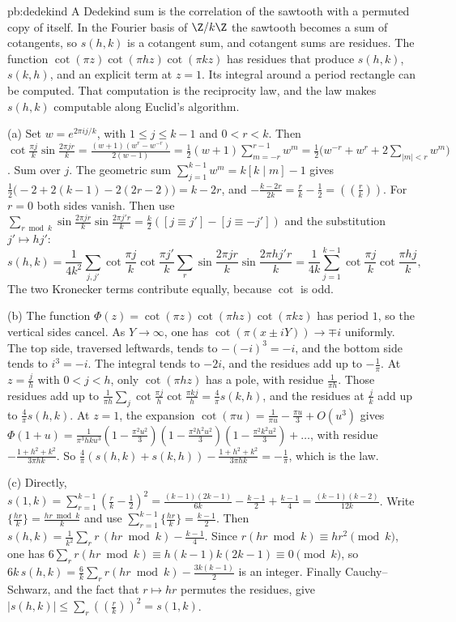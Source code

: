 \begin{solution}{pb:dedekind}
\idea A Dedekind sum is the correlation of the sawtooth with a permuted copy of itself. In the Fourier basis of $\Z/k\Z$ the sawtooth becomes a sum of cotangents, so $s(h,k)$ is a cotangent sum, and cotangent sums are residues. The function $\cot(\pi z)\cot(\pi hz)\cot(\pi kz)$ has residues that produce $s(h,k)$, $s(k,h)$, and an explicit term at $z=1$. Its integral around a period rectangle can be computed. That computation is the reciprocity law, and the law makes $s(h,k)$ computable along Euclid's algorithm.

\writeup (a) Set $w=e^{2\pi ij/k}$, with $1\le j\le k-1$ and $0<r<k$. Then $\cot\frac{\pi j}k\sin\frac{2\pi jr}k=\frac{(w+1)(w^r-w^{-r})}{2(w-1)}=\frac12(w+1)\sum_{m=-r}^{r-1}w^m=\frac12\bigl(w^{-r}+w^r+2\sum_{|m|<r}w^m\bigr)$. Sum over $j$. The geometric sum $\sum_{j=1}^{k-1}w^m=k[k\mid m]-1$ gives $\frac12\bigl(-2+2(k-1)-2(2r-2)\bigr)=k-2r$, and $-\frac{k-2r}{2k}=\frac rk-\frac12=((\frac rk))$. For $r=0$ both sides vanish. Then use $\sum_{r\bmod k}\sin\frac{2\pi jr}k\sin\frac{2\pi j'r}k=\frac k2([j\equiv j']-[j\equiv-j'])$ and the substitution $j'\mapsto hj'$:
\[
s(h,k)=\frac1{4k^2}\sum_{j,j'}\cot\frac{\pi j}k\cot\frac{\pi j'}k\sum_r\sin\frac{2\pi jr}k\sin\frac{2\pi hj'r}k=\frac1{4k}\sum_{j=1}^{k-1}\cot\frac{\pi j}k\cot\frac{\pi hj}k,
\]
The two Kronecker terms contribute equally, because $\cot$ is odd.

(b) The function $\Phi(z)=\cot(\pi z)\cot(\pi hz)\cot(\pi kz)$ has period $1$, so the vertical sides cancel. As $Y\to\infty$, one has $\cot(\pi(x\pm iY))\to\mp i$ uniformly. The top side, traversed leftwards, tends to $-(-i)^3=-i$, and the bottom side tends to $i^3=-i$. The integral tends to $-2i$, and the residues add up to $-\frac1\pi$. At $z=\frac jh$ with $0<j<h$, only $\cot(\pi hz)$ has a pole, with residue $\frac1{\pi h}$. Those residues add up to $\frac1{\pi h}\sum_j\cot\frac{\pi j}h\cot\frac{\pi kj}h=\frac4\pi s(k,h)$, and the residues at $\frac jk$ add up to $\frac4\pi s(h,k)$. At $z=1$, the expansion $\cot(\pi u)=\frac1{\pi u}-\frac{\pi u}3+O(u^3)$ gives $\Phi(1+u)=\frac1{\pi^3hku^3}(1-\frac{\pi^2u^2}3)(1-\frac{\pi^2h^2u^2}3)(1-\frac{\pi^2k^2u^2}3)+\dots$, with residue $-\frac{1+h^2+k^2}{3\pi hk}$. So $\frac4\pi(s(h,k)+s(k,h))-\frac{1+h^2+k^2}{3\pi hk}=-\frac1\pi$, which is the law.

(c) Directly, $s(1,k)=\sum_{r=1}^{k-1}(\frac rk-\frac12)^2=\frac{(k-1)(2k-1)}{6k}-\frac{k-1}2+\frac{k-1}4=\frac{(k-1)(k-2)}{12k}$. Write $\{\frac{hr}k\}=\frac{hr\bmod k}k$ and use $\sum_{r=1}^{k-1}\{\frac{hr}k\}=\frac{k-1}2$. Then $s(h,k)=\frac1{k^2}\sum_rr\,(hr\bmod k)-\frac{k-1}4$. Since $r(hr\bmod k)\equiv hr^2\pmod k$, one has $6\sum_rr(hr\bmod k)\equiv h(k-1)k(2k-1)\equiv0\pmod k$, so $6k\,s(h,k)=\frac6k\sum_rr(hr\bmod k)-\frac{3k(k-1)}2$ is an integer. Finally Cauchy--Schwarz, and the fact that $r\mapsto hr$ permutes the residues, give $|s(h,k)|\le\sum_r((\frac rk))^2=s(1,k)$.


\end{solution}
